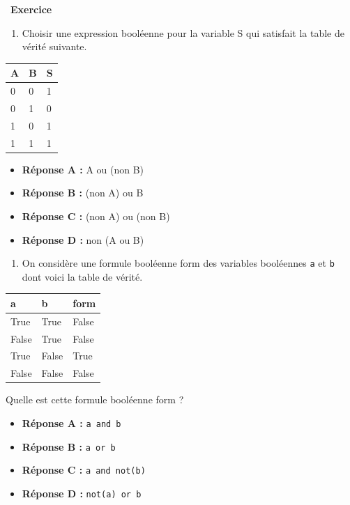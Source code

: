 \documentclass[
  11pt,
]{article}
\newcommand{\passthrough}[1]{#1}
\providecommand{\tightlist}{%
  \setlength{\itemsep}{0pt}\setlength{\parskip}{0pt}}
\newcounter{exo}
\newenvironment{exercice}[1]
{\par \medskip   \addtocounter{exo}{1} \noindent  
\begin{bclogo}[arrondi =0.1,   noborder = true, logo=\bccrayon, marge=4]{~\textbf{Exercice} \textbf{\theexo} {\itshape #1} }  \par}
{
\end{bclogo}
 \par \bigskip }
\newcounter{def}
\begin{document}
\begin{exercice}{}
\begin{enumerate}
\def\labelenumi{\arabic{enumi}.}
\setcounter{enumi}{5}
\tightlist
\item
  Choisir une expression booléenne pour la variable S qui satisfait la
  table de vérité suivante.
\end{enumerate}

\begin{longtable}[]{@{}lll@{}}
\toprule
A & B & S\tabularnewline
\midrule
\endhead
0 & 0 & 1\tabularnewline
0 & 1 & 0\tabularnewline
1 & 0 & 1\tabularnewline
1 & 1 & 1\tabularnewline
\bottomrule
\end{longtable}

\begin{itemize}
\tightlist
\item
  \textbf{Réponse A :} A ou (non B)
\item
  \textbf{Réponse B :} (non A) ou B
\item
  \textbf{Réponse C :} (non A) ou (non B)
\item
  \textbf{Réponse D :} non (A ou B)
\end{itemize}

\begin{enumerate}
\def\labelenumi{\arabic{enumi}.}
\setcounter{enumi}{6}
\tightlist
\item
  On considère une formule booléenne form des variables booléennes
  \passthrough{\lstinline!a!} et \passthrough{\lstinline!b!} dont voici
  la table de vérité.
\end{enumerate}

\begin{longtable}[]{@{}lll@{}}
\toprule
a & b & form\tabularnewline
\midrule
\endhead
True & True & False\tabularnewline
False & True & False\tabularnewline
True & False & True\tabularnewline
False & False & False\tabularnewline
\bottomrule
\end{longtable}

Quelle est cette formule booléenne form ?

\begin{itemize}
\tightlist
\item
  \textbf{Réponse A :} \passthrough{\lstinline!a and b!}
\item
  \textbf{Réponse B :} \passthrough{\lstinline!a or b!}
\item
  \textbf{Réponse C :} \passthrough{\lstinline!a and not(b)!}
\item
  \textbf{Réponse D :} \passthrough{\lstinline!not(a) or b!}
\end{itemize}

\end{exercice}
\end{document}

